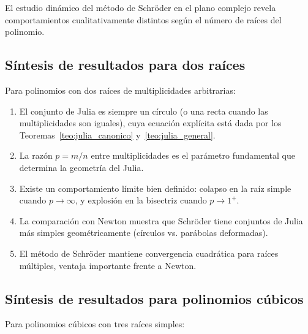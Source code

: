 El estudio dinámico del método de Schröder en el plano complejo revela comportamientos cualitativamente distintos según el número de raíces del polinomio.

\subsection{Síntesis de resultados para dos raíces}

Para polinomios con dos raíces de multiplicidades arbitrarias:

\begin{enumerate}
\item El conjunto de Julia es siempre un círculo (o una recta cuando las multiplicidades son iguales), cuya ecuación explícita está dada por los Teoremas~\ref{teo:julia_canonico} y~\ref{teo:julia_general}.

\item La razón $p=m/n$ entre multiplicidades es el parámetro fundamental que determina la geometría del Julia.

\item Existe un comportamiento límite bien definido: colapso en la raíz simple cuando $p\to\infty$, y explosión en la bisectriz cuando $p\to 1^+$.

\item La comparación con Newton muestra que Schröder tiene conjuntos de Julia más simples geométricamente (círculos vs. parábolas deformadas).

\item El método de Schröder mantiene convergencia cuadrática para raíces múltiples, ventaja importante frente a Newton.
\end{enumerate}

\subsection{Síntesis de resultados para polinomios cúbicos}

Para polinomios cúbicos con tres raíces simples:

